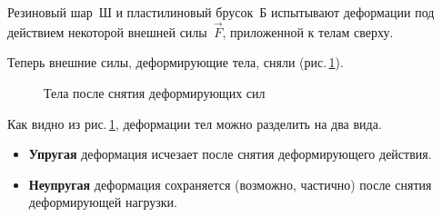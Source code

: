 \documentclass[main.tex]{subfiles}
\begin{document}
Резиновый шар~Ш и пластилиновый брусок~Б испытывают деформации под действием некоторой внешней силы~$\vec F$, приложенной к телам сверху. 

Теперь внешние силы, деформирующие тела, сняли (рис.\,\ref{fig:p39}).

\begin{figure}[H]
    \centering

\caption{Тела после снятия деформирующих сил}
\label{fig:p39}
\end{figure}

Как видно из рис.\,\ref{fig:p39}, деформации тел можно разделить на два вида.
\begin{itemize}
    \item \textbf{Упругая} деформация исчезает после снятия деформирующего действия.
    \item \textbf{Неупругая} деформация сохраняется (возможно, частично) после снятия деформирующей нагрузки.  
\end{itemize}
\end{document}
